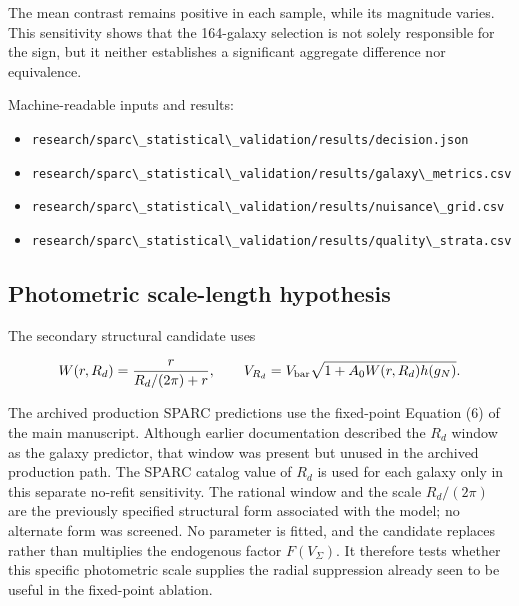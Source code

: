 \documentclass[utf8]{frontiers_suppmat}
\providecommand{\tightlist}{}
\newcommand{\passthrough}[1]{#1}
\begin{document}
The mean contrast remains positive in each sample, while its magnitude varies. This sensitivity shows that the 164-galaxy selection is not solely responsible for the sign, but it neither establishes a significant aggregate difference nor equivalence.

Machine-readable inputs and results:

\begin{itemize}
\tightlist
\item
  \passthrough{\lstinline!research/sparc\_statistical\_validation/results/decision.json!}
\item
  \passthrough{\lstinline!research/sparc\_statistical\_validation/results/galaxy\_metrics.csv!}
\item
  \passthrough{\lstinline!research/sparc\_statistical\_validation/results/nuisance\_grid.csv!}
\item
  \passthrough{\lstinline!research/sparc\_statistical\_validation/results/quality\_strata.csv!}
\end{itemize}

\subsection{Photometric scale-length hypothesis}\label{s4.5-photometric-scale-length-hypothesis}

The secondary structural candidate uses

\[
W(r,R_d)=\frac{r}{R_d/(2\pi)+r},
\qquad
V_{R_d}=V_{\rm bar}
\sqrt{1+A_0W(r,R_d)h(g_N)}.
\]

The archived production SPARC predictions use the fixed-point Equation (6) of the main manuscript. Although earlier documentation described the \(R_d\) window as the galaxy predictor, that window was present but unused in the archived production path. The SPARC catalog value of \(R_d\) is used for each galaxy only in this separate no-refit sensitivity. The rational window and the scale \(R_d/(2\pi)\) are the previously specified structural form associated with the model; no alternate form was screened. No parameter is fitted, and the candidate replaces rather than multiplies the endogenous factor \(F(V_\Sigma)\). It therefore tests whether this specific photometric scale supplies the radial suppression already seen to be useful in the fixed-point ablation.
\end{document}
